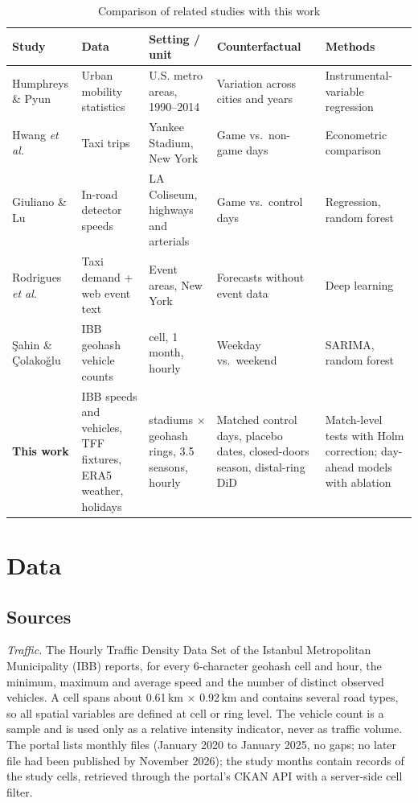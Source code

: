 \documentclass[conference]{IEEEtran}
\begin{document}
\begin{table}[t]
\caption{Comparison of related studies with this work}
\label{tab:lit}
\centering\footnotesize
\begin{tabular}{@{}>{\raggedright\arraybackslash}p{2.5cm}>{\raggedright\arraybackslash}p{3.5cm}>{\raggedright\arraybackslash}p{3.5cm}>{\raggedright\arraybackslash}p{3.3cm}>{\raggedright\arraybackslash}p{3.5cm}@{}}
\toprule
Study & Data & Setting / unit & Counterfactual & Methods \\
\midrule
Humphreys \& Pyun \cite{humphreys2018} & Urban mobility statistics & 25 U.S. metro areas, 1990--2014 & Variation across cities and years & Instrumental-variable regression \\
Hwang \textit{et al.} \cite{hwang2025} & Taxi trips & Yankee Stadium, New York & Game vs.\ non-game days & Econometric comparison \\
Giuliano \& Lu \cite{giuliano2021} & In-road detector speeds & LA Coliseum, highways and arterials & Game vs.\ control days & Regression, random forest \\
Rodrigues \textit{et al.} \cite{rodrigues2019} & Taxi demand + web event text & Event areas, New York & Forecasts without event data & Deep learning \\
\c{S}ahin \& Çolako\u{g}lu \cite{sahin2025} & IBB geohash vehicle counts & 1 cell, 1 month, hourly & Weekday vs.\ weekend & SARIMA, random forest \\
\textbf{This work} & IBB speeds and vehicles, TFF fixtures, ERA5 weather, holidays & 3 stadiums $\times$ geohash rings, 3.5 seasons, hourly & Matched control days, placebo dates, closed-doors season, distal-ring DiD & Match-level tests with Holm correction; day-ahead models with ablation \\
\bottomrule
\end{tabular}
\end{table}

\section{Data}
\subsection{Sources}
\textit{Traffic.} The Hourly Traffic Density Data Set of the Istanbul Metropolitan Municipality (IBB) \cite{ibb_data} reports, for every 6-character geohash cell \cite{geohash} and hour, the minimum, maximum and average speed and the number of distinct observed vehicles. A cell spans about 0.61\,km $\times$ 0.92\,km and contains several road types, so all spatial variables are defined at cell or ring level. The vehicle count is a sample and is used only as a relative intensity indicator, never as traffic volume. The portal lists \vInvFiles monthly files (January 2020 to January 2025, no gaps; no later file had been published by November 2026); the \vStudyMonths study months contain \vRawRows records of the study cells, retrieved through the portal's CKAN API with a server-side cell filter.
\end{document}
